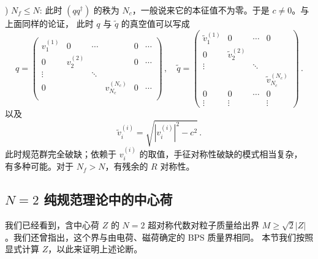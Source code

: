 ) $N_f \leq N$:  此时 $(qq^\dagger)$
的秩为 $N_c$，一般说来它的本征值不为零。于是 $c\not=0$。与上面同样的论证，
此时 $q$ 与 $\widetilde q$ 的真空值可以写成
$$
q = \left(
\begin{array}{cccccc}
v^{(1)}_1 & 0 & \cdots & & 0 & \cdots \\
 0 & v^{(2)}_2 & & & 0 & \cdots \\
\vdots  & & \ddots &  &   &  \\
 0 & & & v^{(N_c)}_{N_c} & 0 & \cdots  \\
\end{array}
\right)\,,\quad
\widetilde q = \left(
\begin{array}{cccc}
\tilde v^{(1)}_1 & 0 &\cdots&0\\
0 &\tilde v^{(2)}_2 &&\\
\vdots&&\ddots & \\
&&&\tilde v^{(N_c)}_{N_c}\\
0&0&\cdots&0\\
\vdots&\vdots&&\vdots
\end{array}
\right)\,.
$$
以及
$$
\tilde{v}_{i}^{(i)} = \sqrt{|v_{i}^{(i)}|^2 - c^2} \, .
$$
此时规范群完全破缺；依赖于 $v_{i}^{(i)}$ 的取值，手征对称性破缺的模式相当复杂，
有多种可能。对于 $N_f > N$，有残余的 $R$ 对称性。

\subsection{$N=2$ 纯规范理论中的中心荷}

我们已经看到，含中心荷 $Z$ 的 $N=2$ 超对称代数对粒子质量给出界
$M\ge \sqrt{2}|Z|$。我们还曾指出，这个界与由电荷、磁荷确定的 BPS 质量界相同。
本节我们按照 \cite{Olive-Witten} 显式计算 $Z$，以此来证明上述论断。

